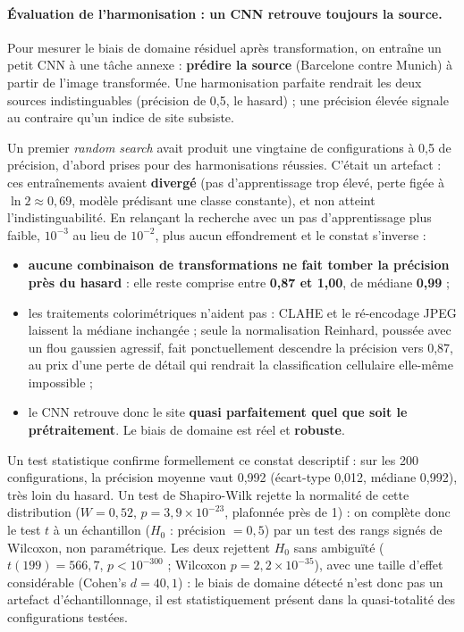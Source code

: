 \paragraph{Évaluation de l’harmonisation : un CNN retrouve toujours la source.} Pour mesurer le biais de domaine résiduel après transformation, on entraîne un petit CNN à une tâche annexe : \textbf{prédire la source} (Barcelone contre Munich) à partir de l’image transformée.
Une harmonisation parfaite rendrait les deux sources indistinguables (précision de 0,5, le hasard) ; une précision élevée signale au contraire qu’un indice de site subsiste.

Un premier \emph{random search} avait produit une vingtaine de configurations à 0,5 de précision, d’abord prises pour des harmonisations réussies.
C’était un artefact : ces entraînements avaient \textbf{divergé} (pas d’apprentissage trop élevé, perte figée à $\ln 2 \approx 0{,}69$, modèle prédisant une classe constante), et non atteint l’indistinguabilité.
En relançant la recherche avec un pas d’apprentissage plus faible, $10^{-3}$ au lieu de $10^{-2}$, plus aucun effondrement et le constat s’inverse :

\begin{itemize}
  \item \textbf{aucune combinaison de transformations ne fait tomber la précision près du hasard} : elle reste comprise entre \textbf{0,87 et 1,00}, de médiane \textbf{0,99} ;
  \item les traitements colorimétriques n’aident pas : CLAHE et le ré-encodage JPEG laissent la médiane inchangée ; seule la normalisation Reinhard, poussée avec un flou gaussien agressif, fait ponctuellement descendre la précision vers 0,87, au prix d’une perte de détail qui rendrait la classification cellulaire elle-même impossible ;
  \item le CNN retrouve donc le site \textbf{quasi parfaitement quel que soit le prétraitement}.
Le biais de domaine est réel et \textbf{robuste}.
\end{itemize}

Un test statistique confirme formellement ce constat descriptif : sur les 200 configurations, la précision moyenne vaut 0,992 (écart-type 0,012, médiane 0,992), très loin du hasard.
Un test de Shapiro-Wilk rejette la normalité de cette distribution ($W = 0{,}52$, $p = 3{,}9 \times 10^{-23}$, plafonnée près de 1) : on complète donc le test $t$ à un échantillon ($H_0$ : précision $= 0{,}5$) par un test des rangs signés de Wilcoxon, non paramétrique.
Les deux rejettent $H_0$ sans ambiguïté ($t(199) = 566{,}7$, $p < 10^{-300}$ ; Wilcoxon $p = 2{,}2 \times 10^{-35}$), avec une taille d'effet considérable (Cohen's $d = 40{,}1$) : le biais de domaine détecté n'est donc pas un artefact d'échantillonnage, il est statistiquement présent dans la quasi-totalité des configurations testées.

